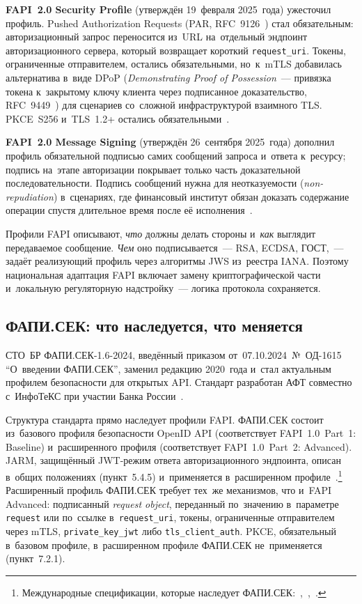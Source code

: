 \textbf{FAPI~2.0 Security Profile} (утверждён 19~февраля 2025~года) ужесточил
профиль. Pushed Authorization Requests (PAR, RFC~9126~\cite{rfc-9126-par})
стал обязательным: авторизационный запрос переносится из~URL на~отдельный
эндпоинт авторизационного сервера, который возвращает короткий
\texttt{request\_uri}. Токены, ограниченные отправителем, остались обязательными,
но~к~mTLS добавилась альтернатива в~виде DPoP (\textit{Demonstrating Proof of
  Possession}~--- привязка токена к~закрытому ключу клиента через подписанное
доказательство, RFC~9449~\cite{rfc-9449-dpop}) для сценариев со~сложной
инфраструктурой взаимного TLS. PKCE~S256 и~TLS~1.2+ остались
обязательными~\cite{fapi-2-security-profile}.

\textbf{FAPI~2.0 Message Signing} (утверждён 26~сентября 2025~года) дополнил
профиль обязательной подписью самих сообщений запроса и~ответа к~ресурсу;
подпись на~этапе авторизации покрывает только часть доказательной последовательности.
Подпись сообщений нужна для неотказуемости (\textit{non-repudiation}) в~сценариях, где
финансовый институт обязан доказать содержание операции спустя длительное время
после её исполнения~\cite{fapi-2-message-signing}.

Профили FAPI описывают, \emph{что} должны делать стороны и~\emph{как} выглядит
передаваемое сообщение. \emph{Чем} оно подписывается~--- RSA, ECDSA, ГОСТ,~---
задаёт реализующий профиль через алгоритмы JWS из~реестра IANA. Поэтому
национальная адаптация FAPI включает замену криптографической
части и~локальную регуляторную надстройку~--- логика протокола сохраняется.

\subsection*{ФАПИ.СЕК: что наследуется, что меняется}

СТО~БР ФАПИ.СЕК-1.6-2024, введённый приказом от~07.10.2024~№~ОД-1615
\enquote{О~введении ФАПИ.СЕК}, заменил редакцию 2020~года и~стал актуальным
профилем безопасности для открытых API. Стандарт разработан АФТ совместно
с~ИнфоТеКС при
участии Банка России~\cite{fapi-sec-2024,cbr-fapi-sec-9908}.

Структура стандарта прямо наследует профили FAPI. ФАПИ.СЕК состоит из~базового профиля безопасности OpenID API (соответствует
FAPI~1.0~Part~1: Baseline) и~расширенного профиля (соответствует
FAPI~1.0~Part~2: Advanced). JARM, защищённый JWT-режим ответа
авторизационного эндпоинта, описан в~общих положениях (пункт~5.4.5)
и~применяется в~расширенном профиле~\cite{fapi-sec-2024}.\footnote{Международные спецификации, которые
наследует ФАПИ.СЕК:~\cite{fapi-1-part1},~\cite{fapi-1-part2},~\cite{oidf-jarm}.}
Расширенный профиль ФАПИ.СЕК требует тех~же механизмов, что и~FAPI Advanced:
подписанный \textit{request object}, переданный по~значению в~параметре
\texttt{request} или по~ссылке в~\texttt{request\_uri}, токены, ограниченные
отправителем через mTLS, \texttt{private\_key\_jwt} либо
\texttt{tls\_client\_auth}. PKCE, обязательный в~базовом профиле,
в~расширенном профиле ФАПИ.СЕК не~применяется (пункт~7.2.1).

